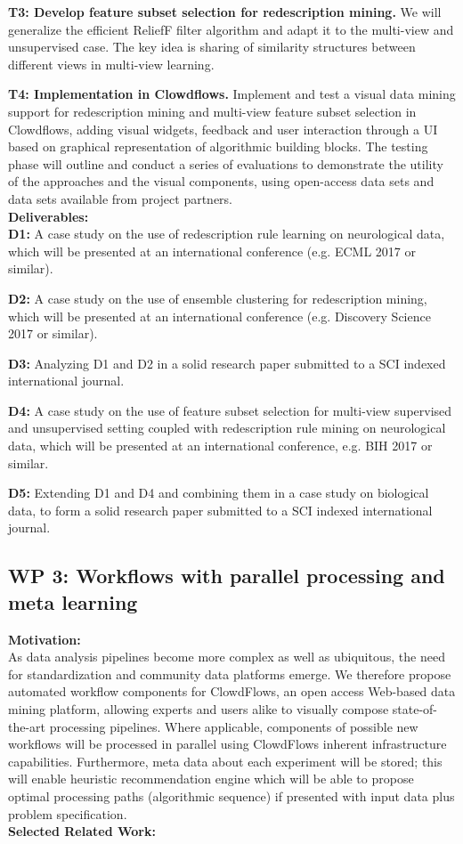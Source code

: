 \documentclass[a4paper,11pt]{article}
\begin{document}
\textbf{T3: Develop feature subset selection for redescription mining.} We will generalize the efficient ReliefF filter algorithm and adapt it to the multi-view and unsupervised case. The key idea is sharing of similarity structures between different views in multi-view learning.

\textbf{T4: Implementation in Clowdflows.} Implement and test a visual data mining support for redescription mining and multi-view feature subset selection in Clowdflows, adding visual widgets, feedback and user interaction through a UI based on graphical representation of algorithmic building blocks. The testing phase will outline and conduct a series of evaluations to demonstrate the utility of the approaches and the visual components, using open-access data sets and data sets available from project partners.
%
%
\\[0,2cm]
\textbf{Deliverables:}\\
\textbf{D1:} A case study on the use of redescription rule learning on neurological data, which will be presented at an international conference (e.g. ECML 2017 or similar).

\textbf{D2:} A case study on the use of ensemble clustering for redescription mining, which will be presented at an international conference (e.g. Discovery Science 2017 or similar).

\textbf{D3:} Analyzing D1 and D2 in a solid research paper submitted to a SCI indexed international journal.

\textbf{D4:} A case study on the use of feature subset selection for multi-view supervised and unsupervised setting coupled with redescription rule mining on neurological data, which will be presented at an international conference, e.g. BIH 2017 or similar.

\textbf{D5:} Extending D1 and D4 and combining them in a case study on biological data, to form a solid research paper submitted to a SCI indexed international journal.



\subsection{WP 3: Workflows with parallel processing and meta learning }

\textbf{Motivation:}
\\[0,2cm]
As data analysis pipelines become more complex as well as ubiquitous, the need for standardization and community data platforms emerge. We therefore propose automated workflow components for ClowdFlows, an open access Web-based data mining platform, allowing experts and users alike to visually compose state-of-the-art processing pipelines. Where applicable, components of possible new workflows will be processed in parallel using ClowdFlows inherent infrastructure capabilities. Furthermore, meta data about each experiment will be stored; this will enable heuristic recommendation engine which will be able to propose optimal processing paths (algorithmic sequence) if presented with input data plus problem specification.
%
%
\\[0,2cm]
\textbf{Selected Related Work:}
\end{document}

